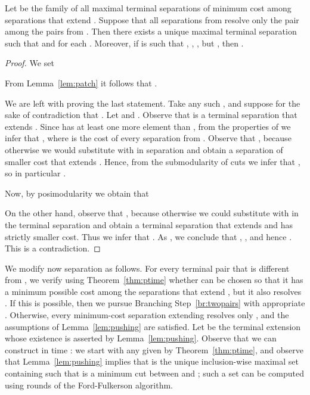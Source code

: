 \begin{lemma}\label{lem:pushing}
Let  be the family of all maximal terminal separations  of minimum cost among separations that extend . Suppose that all separations from  resolve only the pair  among the pairs from . Then there exists a unique maximal terminal separation  such that  and  for each . Moreover, if  is such that , , , but , then .
\end{lemma}
\begin{proof}
We set 

From Lemma~\ref{lem:patch} it follows that . 

\newcommand{\oA}{\overline{A}}
\newcommand{\oB}{\overline{B}}

We are left with proving the last statement. Take any such , and suppose for the sake of contradiction that . Let  and . Observe that  is a terminal separation that extends . Since  has at least one more element than , from the properties of  we infer that , where  is the cost of every separation from . Observe that , because otherwise we would substitute  with  in separation  and obtain a separation of smaller cost that extends . Hence, from the submodularity of cuts we infer that , so in particular .

Now, by posimodularity we obtain that

On the other hand, observe that , because otherwise we could substitute  with  in the terminal separation  and obtain a terminal separation that extends  and has strictly smaller cost. Thus we infer that . As , we conclude that , , and hence . This is a contradiction.
\end{proof}

We modify now separation  as follows. For every terminal pair  that is different from , we verify using Theorem~\ref{thm:ptime} whether  can be chosen so that it has a minimum possible cost among the separations that extend , but it also resolves . If this is possible, then we pursue Branching Step~\ref{br:twopairs} with appropriate . Otherwise, every minimum-cost separation extending  resolves only , and the assumptions of Lemma~\ref{lem:pushing} are satisfied.
Let  be the terminal extension whose existence is asserted by Lemma~\ref{lem:pushing}.
Observe that we can construct  in time :
we start with any  given by Theorem~\ref{thm:ptime},
and observe that Lemma~\ref{lem:pushing} implies that  is the unique inclusion-wise maximal set
containing  such that  is a minimum cut between  and ;
such a set can be computed using  rounds of the Ford-Fulkerson algorithm.
  
